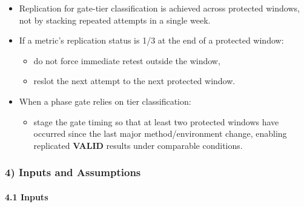 \documentclass[10pt]{article}
\begin{document}
\begin{itemize}
\item Replication for gate-tier classification is achieved across protected windows, not by stacking repeated attempts in a single week.
\item If a metric’s replication status is 1/3 at the end of a protected window:
  \begin{itemize}
  \item do not force immediate retest outside the window,
  \item reslot the next attempt to the next protected window.
  \end{itemize}
\item When a phase gate relies on tier classification:
  \begin{itemize}
  \item stage the gate timing so that at least two protected windows have occurred since the last major method/environment change, enabling replicated \textbf{VALID} results under comparable conditions.
  \end{itemize}
\end{itemize}

\subsubsection*{4) Inputs and Assumptions}

\paragraph*{4.1 Inputs}
\end{document}
